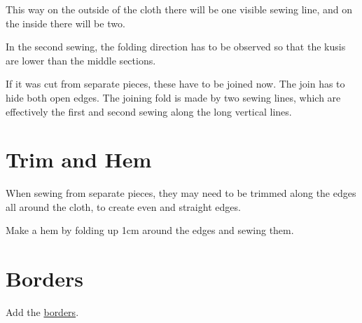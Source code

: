 This way on the outside of the cloth there will be one visible sewing
line, and on the inside there will be two.

In the second sewing, the folding direction has to be observed so that
the kusis are lower than the middle sections.

If it was cut from separate pieces, these have to be joined now. The
join has to hide both open edges. The joining fold is made by two sewing
lines, which are effectively the first and second sewing along the long
vertical lines.

\section{Trim and Hem}

When sewing from separate pieces, they may need to be trimmed along the
edges all around the cloth, to create even and straight edges.

Make a hem by folding up 1cm around the edges and sewing them.

\section{Borders}

Add the \href{/en/borders}{borders}.

